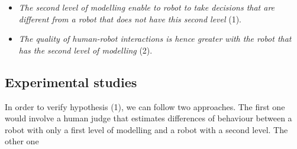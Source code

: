 \documentclass[10pt,a4paper]{article}
\begin{document}
\begin{itemize}
\item \textit{The second level of modelling enable to robot to take decisions that are different from a robot that does not have this second level} (1).

\item \textit{The quality of human-robot interactions is hence greater with the robot that has the second level of modelling} (2).
\end{itemize}

\subsection{Experimental studies}

In order to verify hypothesis (1), we can follow two approaches. The first one would involve a human judge that estimates differences of behaviour between a robot with only a first level of modelling and a robot with a second level. The other one  


\end{document}
